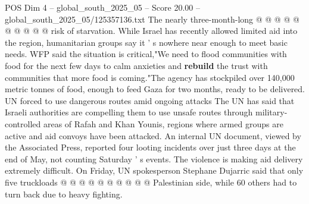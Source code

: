 \begin{textsample}{POS Dim 4 – global\_south\_2025\_05 – Score 20.00 – global\_south\_2025\_05/125357136.txt}
The nearly three-month-long @ @ @ @ @ @ @ @ @ @ risk of starvation.
While Israel has recently allowed limited aid into the region, humanitarian groups say it ' s nowhere near enough to meet basic needs.
WFP said the situation is critical,"We need to flood communities with food for the next few days to calm anxieties and \textbf{rebuild} the trust with communities that more food is coming."The agency has stockpiled over 140,000 metric tonnes of food, enough to feed Gaza for two months, ready to be delivered.
UN forced to use dangerous routes amid ongoing attacks The UN has said that Israeli authorities are compelling them to use unsafe routes through military-controlled areas of Rafah and Khan Younis, regions where armed groups are active and aid convoys have been attacked.
An internal UN document, viewed by the Associated Press, reported four looting incidents over just three days at the end of May, not counting Saturday ' s events.
The violence is making aid delivery extremely difficult.
On Friday, UN spokesperson Stephane Dujarric said that only five truckloads @ @ @ @ @ @ @ @ @ @ Palestinian side, while 60 others had to turn back due to heavy fighting.

\end{textsample}
